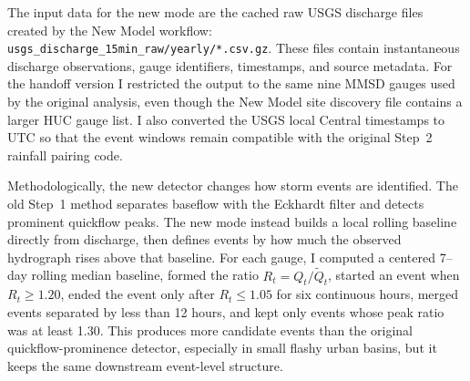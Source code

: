 \documentclass[11pt]{article}
\begin{document}
The input data for the new mode are the cached raw USGS discharge files created by the New
Model workflow: \texttt{usgs\_discharge\_15min\_raw/yearly/*.csv.gz}. These files contain
instantaneous discharge observations, gauge identifiers, timestamps, and source metadata.
For the handoff version I restricted the output to the same nine MMSD gauges used by the
original analysis, even though the New Model site discovery file contains a larger HUC
gauge list. I also converted the USGS local Central timestamps to UTC so that the event
windows remain compatible with the original Step~2 rainfall pairing code.

Methodologically, the new detector changes how storm events are identified. The old Step~1
method separates baseflow with the Eckhardt filter and detects prominent quickflow peaks.
The new mode instead builds a local rolling baseline directly from discharge, then defines
events by how much the observed hydrograph rises above that baseline. For each gauge, I
computed a centered 7--day rolling median baseline, formed the ratio
$R_t=Q_t/\widetilde{Q}_t$, started an event when $R_t\ge1.20$, ended the event only after
$R_t\le1.05$ for six continuous hours, merged events separated by less than 12 hours, and
kept only events whose peak ratio was at least 1.30. This produces more candidate events
than the original quickflow-prominence detector, especially in small flashy urban basins,
but it keeps the same downstream event-level structure.
\end{document}
